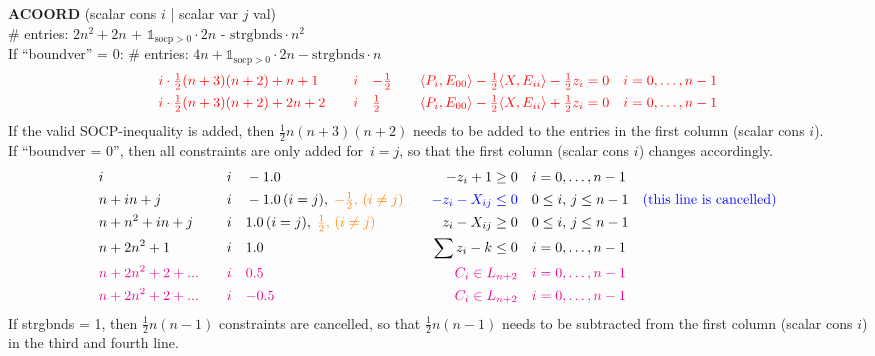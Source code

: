 \documentclass[11pt,a4paper]{article}
\newcommand{\ones}{\mathds{1}}
\theoremstyle{definition}
\begin{document}
{\noindent
\textbf{ACOORD} (scalar cons $i$ | scalar var $j$ val) \\
\# entries: $2n^2+2n$ + {\color{red} $\ones_{\text{socp}> 0}\cdot 2n$} -
{\color{blue}
  $\text{strgbnds} \cdot n^2$} \\
{\color{violet} If ``boundver'' = 0: \# entries: $4n +\ones_{\text{socp}>
    0} \cdot 2n - \text{strgbnds} \cdot n$} \\
\[
  \begin{aligned}
    &{\color{red}i\cdot\tfrac{1}{2}(n+3)(n+2) + n+1} \quad & {\color{red}i} \quad &
    {\color{red}-\tfrac{1}{2}} \quad & {\color{red} \langle P_i, E_{00}
      \rangle - \tfrac{1}{2}\langle X,E_{ii}\rangle - \tfrac{1}{2}z_i = 0}
    \quad &{\color{red} i = 0,\dots,n-1} \\
    &{\color{red}i\cdot\tfrac{1}{2}(n+3)(n+2) + 2n+2} \quad & {\color{red}i} \quad &
    {\color{red}\tfrac{1}{2}} \quad & {\color{red} \langle P_i, E_{00}
      \rangle - \tfrac{1}{2}\langle X,E_{ii}\rangle + \tfrac{1}{2}z_i = 0}
    \quad &{\color{red} i = 0,\dots,n-1} \\
  \end{aligned}
\]
{\color{red} If the valid SOCP-inequality is added, then $\tfrac{1}{2}n(n+3)(n+2)$ needs
  to be added to the entries in the first column (scalar cons $i$).}\\
{\color{violet} If ``boundver = 0'', then all constraints are only added
  for~$i=j$, so that the first column (scalar cons $i$) changes accordingly.}\\
\[
  \begin{aligned}
    &i \quad & i \quad & -1.0 \quad & -z_i + 1 \geq 0 \quad & i = 0, \dots,
    n-1 \\
    &n+in+j \quad & i \quad & -1.0\, (i =
    j),\; {\color{orange} -\tfrac{1}{2},\,(i \neq j)} \quad & {\color{blue}-z_i - X_{ij}
    \leq 0} \quad & 0 \leq i,\, j \leq n-1 \quad {\color{blue}
    (\text{this line is cancelled})} \\
    &n+n^2+in+j \quad & i \quad & 1.0\, (i =
    j),\; {\color{orange} \tfrac{1}{2},\,(i \neq j)}\quad & z_i - X_{ij}
    \geq 0 \quad & 0 \leq i,\, j \leq n-1 \\
    &n+2n^2+1 \quad & i \quad & 1.0 \quad & \sum z_i - k \leq 0 \quad &
    i = 0,\dots,n-1 \\
    & {\color{magenta}n+2n^2+2+...} \quad & {\color{magenta} i} \quad &
    {\color{magenta} 0.5} \quad & {\color{magenta} C_i \in L_{n+2}} \quad &
    {\color{magenta} i = 0,\dots,n-1} \\
    & {\color{magenta}n+2n^2+2+...} \quad & {\color{magenta} i} \quad &
    {\color{magenta} -0.5} \quad & {\color{magenta} C_i \in L_{n+2}} \quad &
    {\color{magenta} i = 0,\dots,n-1} \\
  \end{aligned}
\]
\noindent
{\color{blue} If strgbnds = 1, then $\tfrac{1}{2}n(n-1)$ constraints are
  cancelled, so that $\tfrac{1}{2}n(n-1)$ needs to be subtracted from the
  first column (scalar cons $i$) in the third and fourth line.\\
}

}
\end{document}
